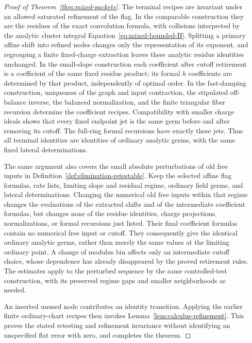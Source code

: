 \begin{proof}[Proof of Theorem~\ref{thm:mixed-packets}]
The terminal recipes are invariant under an allowed saturated
refinement of the flag. In the comparable construction they are
the residues of the exact convolution formula, with collisions
interpreted by the analytic cluster integral
Equation~\eqref{eq:mixed-bounded-H}. Splitting a primary affine
shift into refined nodes changes only the representation of its
exponent, and regrouping a finite fixed-charge extraction leaves
these analytic residue identities unchanged. In the small-slope
construction each coefficient after cutoff retirement is a
coefficient of the same fixed residue product; its formal
$h$ coefficients are determined by that product, independently
of optimal order. In the fast-damping construction, uniqueness
of the graph and input contraction, the stipulated off-balance
inverse, the balanced normalization, and the finite triangular
fiber recursion determine the coefficient recipes. Compatibility
with smaller charge ideals shows that every fixed endpoint jet
is the same germ before and after removing its cutoff. The
full-ring formal recursions have exactly these jets. Thus all
terminal identities are identities of ordinary analytic germs,
with the same fixed lateral determinations.

The same argument also covers the small absolute perturbations of
old free inputs in Definition~\ref{def:elimination-retestable}.
Keep the selected affine flag formulas, rate lists, limiting slope
and residual regime, ordinary field germs, and lateral determinations.
Changing the numerical old free inputs within that regime changes
the evaluations of the extracted shifts and of the intermediate
coefficient formulas, but changes none of the residue identities,
charge projections, normalizations, or formal recursions just
listed. Their final coefficient formulas contain no numerical free
input or cutoff. They consequently give the identical ordinary
analytic germs, rather than merely the same values at the limiting
ordinary point. A change of modulus bin affects only an intermediate
cutoff choice, whose dependence has already disappeared by the
proved retirement rules. The estimates apply to the perturbed
sequence by the same controlled-test construction, with its
preserved regime gaps and smaller neighborhoods as needed.

An inserted unused node contributes an identity transition. Applying the earlier
finite ordinary-chart recipes then invokes
Lemma~\ref{lem:calculus-refinement}. This proves the stated retesting
and refinement invariance without identifying an unspecified flat error with
zero, and completes the theorem.
\end{proof}

